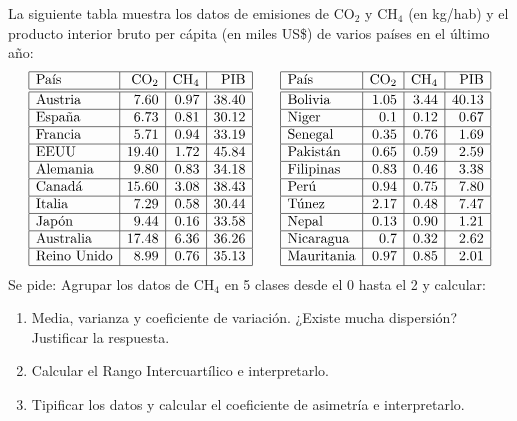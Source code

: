 {La siguiente tabla muestra los datos de emisiones de CO$_2$ y CH$_4$ (en kg/hab) y el producto interior bruto per cápita (en miles US\$) de varios países en el último año:
\[
\begin{array}{|l|r|r|r|}
\hline
\mbox{País} & \mbox{CO}_2 & \mbox{CH}_4 & \mbox{PIB}\\
\hline\hline
\mbox{Austria}     & 7.60 & 0.97 & 38.40\\ \hline
\mbox{España}      & 6.73 & 0.81	& 30.12\\ \hline
\mbox{Francia}     & 5.71 & 0.94	& 33.19\\ \hline
\mbox{EEUU}        &19.40 & 1.72	&	45.84\\ \hline
\mbox{Alemania}    & 9.80 & 0.83	& 34.18\\ \hline
\mbox{Canadá}      &15.60 & 3.08	& 38.43\\ \hline
\mbox{Italia}      & 7.29 & 0.58	& 30.44\\ \hline
\mbox{Japón}       &	9.44 & 0.16	& 33.58\\ \hline
\mbox{Australia}   &17.48 & 6.36	& 36.26\\ \hline
\mbox{Reino Unido} & 8.99 & 0.76	& 35.13\\ \hline
\end{array}
\qquad
\begin{array}{|l|r|r|r|}
\hline
\mbox{País} & \mbox{CO}_2 & \mbox{CH}_4 & \mbox{PIB}\\
\hline\hline
\mbox{Bolivia}     & 1.05 & 3.44	& 40.13\\ \hline
\mbox{Niger}       &	0.1	 & 0.12	&	 0.67\\ \hline
\mbox{Senegal}     &	0.35 & 0.76 &  1.69\\ \hline
\mbox{Pakistán}    & 0.65 & 0.59	&  2.59\\ \hline
\mbox{Filipinas}   &	0.83 & 0.46	&  3.38\\ \hline
\mbox{Perú}        & 0.94 & 0.75	&  7.80\\ \hline
\mbox{Túnez}      & 2.17 & 0.48	&  7.47\\ \hline
\mbox{Nepal}       & 0.13 & 0.90	&  1.21\\ \hline
\mbox{Nicaragua}   & 0.7	 & 0.32	&  2.62\\ \hline
\mbox{Mauritania}  & 0.97 & 0.85	&  2.01\\ \hline
\end{array}
\]
Se pide:
Agrupar los datos de CH$_4$ en 5 clases desde el 0 hasta el 2 y calcular:
\begin{enumerate}
\item Media, varianza y coeficiente de variación. ¿Existe mucha dispersión? Justificar la respuesta.
\item Calcular el Rango Intercuartílico e interpretarlo.
\item Tipificar los datos y calcular el coeficiente de asimetría e interpretarlo.
\end{enumerate}
}


